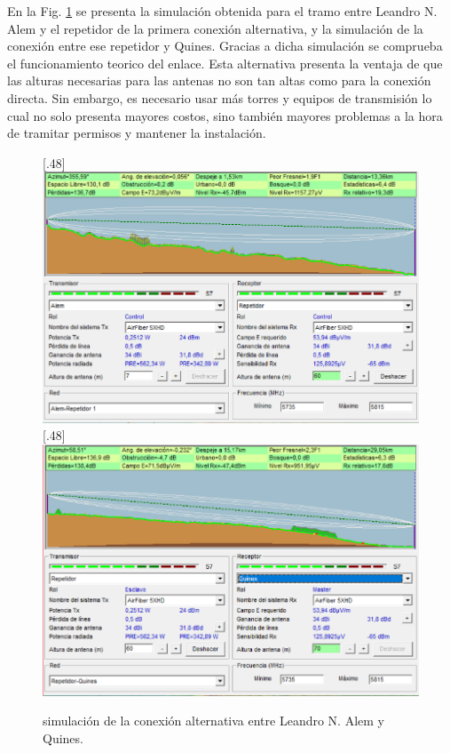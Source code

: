 \documentclass[11pt,a4paper]{article}
\begin{document}
En la Fig. \ref{fig:sim_alt} se presenta la simulación obtenida para el tramo entre Leandro N. Alem y el repetidor de la primera conexión alternativa, y la simulación de la conexión entre ese repetidor y Quines.
Gracias a dicha simulación se comprueba el funcionamiento teorico del enlace.
Esta alternativa presenta la ventaja de que las alturas necesarias para las antenas no son tan altas como para la conexión directa.
Sin embargo, es necesario usar más torres y equipos de transmisión lo cual no solo presenta mayores costos, sino también mayores problemas a la hora de tramitar permisos y mantener la instalación.

\begin{figure}[ht!]
  \centering
  [.48\linewidth]{\includegraphics[height=10\baselineskip]{fotos_ema/sim_alt_alem_rep}}%
  \hfill%
  [.48\linewidth]{\includegraphics[height=10\baselineskip]{fotos_ema/sim_alt_rep_quines}}
  \caption{simulación de la conexión alternativa entre Leandro N. Alem y Quines.}
  \label{fig:sim_alt}
\end{figure}
\end{document}
